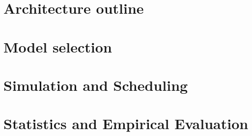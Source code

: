 

\section{Architecture outline}


\section{Model selection}


\section{Simulation and Scheduling}


\section{Statistics and Empirical Evaluation}


